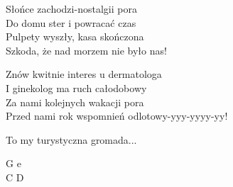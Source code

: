 \begin{text}
    Słońce zachodzi-nostalgii pora\\
    Do domu ster i powracać czas\\
    Pulpety wyszły, kasa skończona\\
    Szkoda, że nad morzem nie było nas!

    Znów kwitnie interes u dermatologa\\
    I ginekolog ma ruch całodobowy\\
    Za nami kolejnych wakacji pora\\
    Przed nami rok wspomnień odlotowy-yyy-yyyy-yy!
     
    \vin To my turystyczna gromada...
\end{text}
\begin{chord}
    G e\\
    C D
\end{chord}